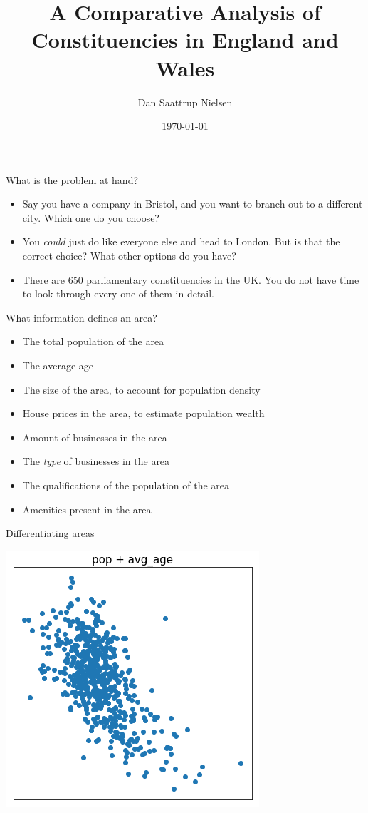 \documentclass{beamer}
\title{A Comparative Analysis of Constituencies in England and Wales}
\author{Dan Saattrup Nielsen}
\date{\today}
\begin{document}
\begin{frame}[plain]
	\titlepage
\end{frame}

\begin{frame}{What is the problem at hand?}
	\begin{itemize}
		\item Say you have a company in Bristol, and you want to branch out to a different city. Which one do you choose?
    \pause\item You \textit{could} just do like everyone else and head to London. But is that the correct choice? What other options do you have?
    \pause\item There are 650 parliamentary constituencies in the UK. You do not have time to look through every one of them in detail.
	\end{itemize}
\end{frame}

\begin{frame}{What information defines an area?}
  \begin{itemize}
    \item The total population of the area
    \item The average age
    \item The size of the area, to account for population density
    \item House prices in the area, to estimate population wealth
    \item Amount of businesses in the area
    \item The \textit{type} of businesses in the area
    \item The qualifications of the population of the area
    \item Amenities present in the area
  \end{itemize}
\end{frame}

\begin{frame}{Differentiating areas}
  \begin{center}
    \includegraphics[scale=.40]{../gfx/cluster0.png}
  \end{center}
\end{frame}
\end{document}
